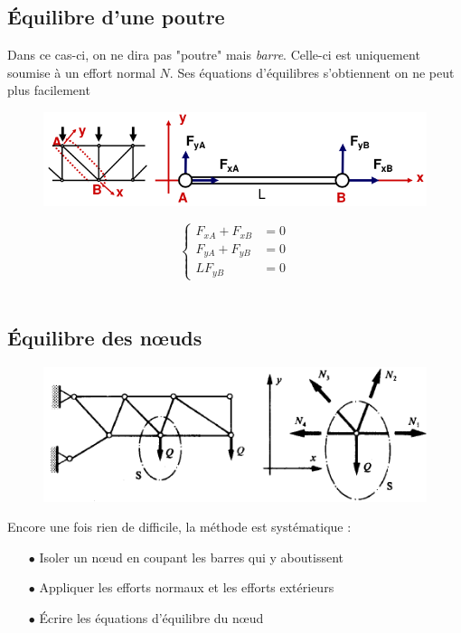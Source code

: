 	\subsection{Équilibre d'une poutre}
	Dans ce cas-ci, on ne dira pas "poutre" mais \textit{barre}. Celle-ci est 
	uniquement soumise à un effort normal $N$. Ses équations d'équilibres 
	s'obtiennent on ne peut plus facilement\\
	\begin{figure}
	\vspace{-8mm}
	\includegraphics[scale=0.4]{ch3/image3.png}
	\end{figure}
	\begin{equation}
	\left\{\begin{array}{ll}
	F_{xA} + F_{xB} &=0\\
	F_{yA} + F_{yB} &= 0\\
	LF_{yB} &=0
	\end{array}\right.
	\end{equation}\ \\
	
	
	\subsection{Équilibre des nœuds}
	\begin{figure}
	\vspace{-4mm}
	\includegraphics[scale=0.4]{ch3/image4.png}
	\end{figure}
		Encore une fois rien de difficile, la méthode est systématique :
	\begin{itemize}
	\item[$\bullet$] Isoler un nœud en coupant les barres qui y aboutissent
	\item[$\bullet$] Appliquer les efforts normaux et les efforts extérieurs
	\item[$\bullet$] Écrire les équations d’équilibre du nœud
	\end{itemize}
	
